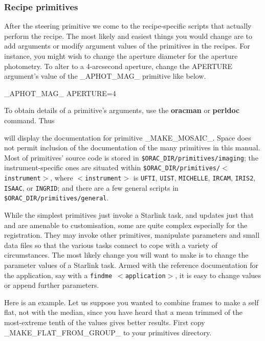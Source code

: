 \documentclass[twoside,11pt,nolof]{starlink}
\begin{document}
\subsubsection{Recipe primitives\label{recipe_primitives}}

After the steering primitive we come to the recipe-specific scripts
that actually perform the recipe.  The most likely and easiest things
you would change are to add arguments or modify argument values of the
primitives in the recipes.  For instance, you might wish to change the
aperture diameter for the aperture photometry.  To alter to a
4-arcsecond aperture, change the APERTURE argument's value of the
\_APHOT\_MAG\_ primitive like below.

\begin{terminalv}
      _APHOT_MAG_ APERTURE=4
\end{terminalv}

To obtain details of a primitive's arguments, use the \textbf{oracman}
or \textbf{perldoc} command.  Thus

\begin{terminalv}
\end{terminalv}
will display the documentation for primitive \_MAKE\_MOSAIC\_.  Space
does not permit inclusion of the documentation of the many primitives
in this manual.  Most of primitives' source code is stored in \texttt{\$ORAC\_DIR/primitives/imaging}; the instrument-specific ones are
situated within \texttt{\$ORAC\_DIR/primitives/$<$instrument$>$}, where
{\tt$<$instrument$>$} is \texttt{UFTI}, \texttt{UIST}, \texttt{MICHELLE}, \texttt{IRCAM}, \texttt{IRIS2}, \texttt{ISAAC}, or \texttt{INGRID}; and there are a few
general scripts in \goodbreak\texttt{\$ORAC\_DIR/primitives/general}.

While the simplest primitives just invoke a Starlink task, and updates
just that and are amenable to customisation, some are quite complex
especially for the registration.  They may invoke other primitives,
manipulate parameters and small data files so that the various tasks
connect to cope with a variety of circumstances.  The most likely
change you will want to make is to change the parameter values of a
Starlink task.  Armed with the reference documentation for the
application, say with a \texttt{findme $<$application$>$}, it is easy
to change values or append further parameters.

Here is an example.  Let us suppose you wanted to combine frames to
make a self flat, not with the median, since you have heard that a mean
trimmed of the most-extreme tenth of the values gives better results.
First copy \_MAKE\_FLAT\_FROM\_GROUP\_ to your primitives directory.
\end{document}
